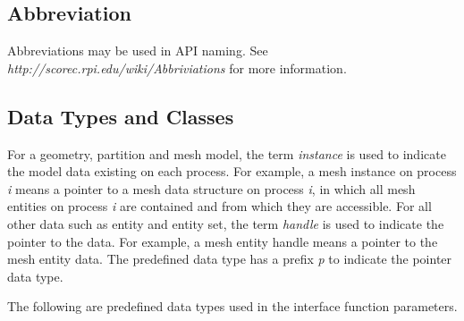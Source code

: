 \subsection{Abbreviation}

Abbreviations may be used in API naming. See \textit{http://scorec.rpi.edu/wiki/Abbriviations} for more information.
 
\subsection{Data Types and Classes}

For a geometry, partition and mesh model, the term \emph{instance} is used to indicate the model data existing on each process. For example, a mesh instance on process \emph{i} means a pointer to a mesh data structure on process \emph{i}, in which all mesh entities on process \emph{i} are contained and from which they are accessible. For all other data such as entity and entity set, the term \emph{handle} is used to indicate the pointer to the data. For example, a mesh entity handle means a pointer to the mesh entity data. The predefined data type has a prefix \emph{p} to indicate the pointer data type.

The following are predefined data types used in the interface function parameters.


